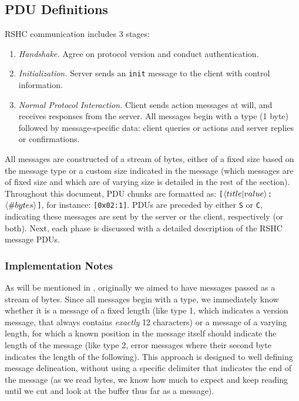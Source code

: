 \subsection{PDU Definitions}
\label{sec:pdus:pdu}

RSHC communication includes 3 stages:

\begin{enumerate}

\item {\em Handshake.} Agree on protocol version and conduct authentication.

\item {\em Initialization.} Server sends an {\tt init} message to the client with control information.

\item {\em Normal Protocol Interaction.} Client sends action messages at will, and receives responses from the server. All messages begin with a type (1 byte) followed by message-specific data: client queries or actions and server replies or confirmations.

\end{enumerate}

All messages are constructed of a stream of bytes, either of a fixed size based on the message type or a custom size indicated in the message (which messages are of fixed size and which are of varying size is detailed in the rest of the section). Throughout this document, PDU chunks are formatted as: {\tt [$\left \langle title | value \right \rangle $:$\left \langle \#bytes \right \rangle $]}, for instance: {\tt [0x02:1]}. PDUs are preceded by either {\tt S} or {\tt C}, indicating these messages are sent by the server or the client, respectively (or both).
Next, each phase is discussed with a detailed description of the RSHC message PDUs.

\subsubsection{Implementation Notes}
\label{sec:pdus:pdu:impl}

As will be mentioned in , originally we aimed to have messages passed as a stream of bytes. Since all messages begin with a type, we immediately know whether it is a message of a fixed length (like type 1, which indicates a version message, that always contains {\em exactly} 12 characters) or a message of a varying length, for which a known position in the message itself should indicate the length of the message (like type 2, error messages where their second byte indicates the length of the following). This approach is designed to well defining message delineation, without using a specific delimiter that indicates the end of the message (as we read bytes, we know how much to expect and keep reading until we cut and look at the buffer thus far as a message).

